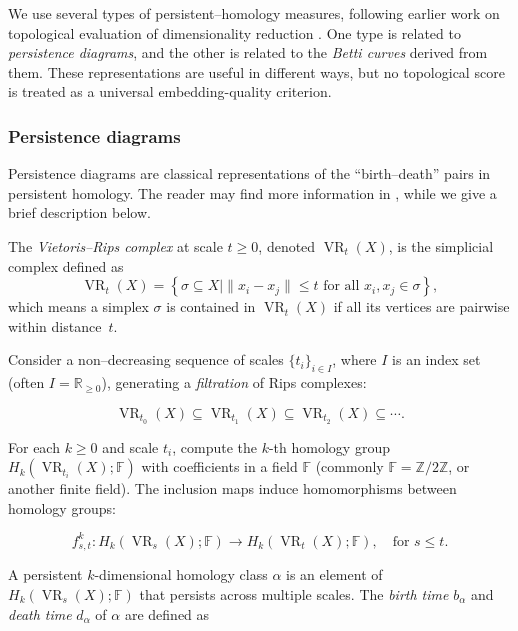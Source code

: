 \documentclass[11pt]{article}
\begin{document}
We use several types of persistent--homology measures, following earlier work on topological evaluation of dimensionality reduction \cite{rieck-leitte-2015}. One type is related to \textit{persistence diagrams}, and the other is related to the \textit{Betti curves} derived from them. These representations are useful in different ways, but no topological score is treated as a universal embedding-quality criterion.

\subsubsection{Persistence diagrams}

Persistence diagrams are classical representations of the ``birth--death'' pairs in persistent homology. The reader may find more information in \cite{ZC, zomorodian2005topology}, while we give a brief description below.

The \textit{Vietoris--Rips complex} at scale \(t \geq 0\), denoted
\(\operatorname{VR}_t(X)\), is the simplicial complex defined as
\[
\operatorname{VR}_t(X) = \left\{ \sigma \subseteq X \mid \|x_i - x_j\| \leq t \text{ for all } x_i, x_j \in \sigma \right\},
\]
which means a simplex \(\sigma\) is contained in \(\operatorname{VR}_t(X)\) if all its vertices are pairwise within distance~\(t\).

Consider a non--decreasing sequence of scales \(\{t_i\}_{i \in I}\), where \(I\) is an index set (often \(I = \mathbb{R}_{\geq 0}\)), generating a \textit{filtration} of Rips complexes:

\[
\operatorname{VR}_{t_0}(X) \subseteq \operatorname{VR}_{t_1}(X) \subseteq \operatorname{VR}_{t_2}(X) \subseteq \cdots.
\]

For each \(k \geq 0\) and scale \(t_i\), compute the \(k\)-th homology group \(H_k\left( \operatorname{VR}_{t_i}(X); \mathbb{F} \right)\) with coefficients in a field \(\mathbb{F}\) (commonly \(\mathbb{F} = \mathbb{Z}/2\mathbb{Z}\), or another finite field). The inclusion maps induce homomorphisms between homology groups:

\[
f_{s,t}^k: H_k\left( \operatorname{VR}_{s}(X); \mathbb{F} \right) \rightarrow H_k\left( \operatorname{VR}_{t}(X); \mathbb{F} \right), \quad \text{for } s \leq t.
\]

A persistent \(k\)-dimensional homology class \(\alpha\) is an element of \(H_k\left( \operatorname{VR}_{s}(X); \mathbb{F} \right)\) that persists across multiple scales. The \textit{birth time} \(b_\alpha\) and \textit{death time} \(d_\alpha\) of \(\alpha\) are defined as
\end{document}
